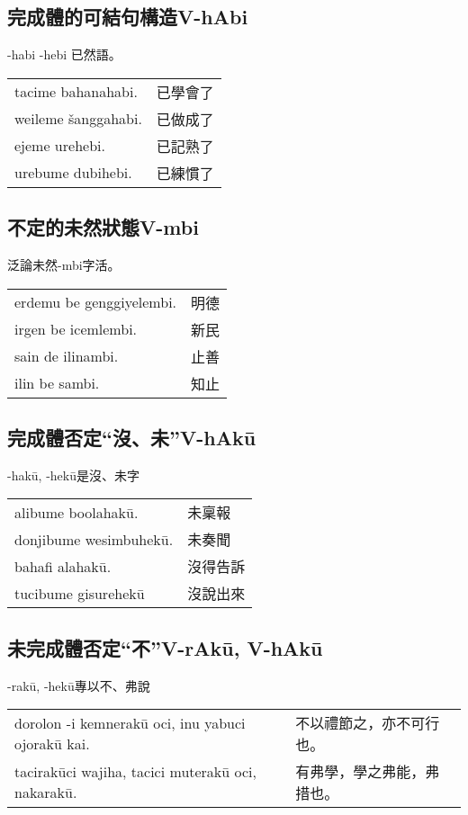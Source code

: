 \documentclass{article}
\begin{document}
\subsection{完成體的可結句構造V-hAbi}
\noindent -habi -hebi 已然語。
\begin{center}
    \begin{tabularx}{\textwidth}{XX}
        tacime bahanahabi. & 已學會了\\
        weileme \v{s}anggahabi. & 已做成了\\
        ejeme urehebi. & 已記熟了\\
        urebume dubihebi. & 已練慣了\\
    \end{tabularx}
\end{center}

\subsection{不定的未然狀態V-mbi}
\noindent 泛論未然-mbi字活。
\begin{center}
    \begin{tabularx}{\textwidth}{XX}
        erdemu be genggiyelembi. & 明德\\
        irgen be icemlembi. & 新民\\
        sain de ilinambi. & 止善\\
        ilin be sambi. & 知止\\
    \end{tabularx}
\end{center}

\subsection{完成體否定“沒、未”V-hAk\={u}}
\noindent -hak\={u}, -hek\={u}是沒、未字
\begin{center}
    \begin{tabularx}{\textwidth}{XX}
        alibume boolahak\={u}. & 未稟報\\
        donjibume wesimbuhek\={u}. & 未奏聞\\
        bahafi alahak\={u}. & 沒得告訴\\
        tucibume gisurehek\={u} & 沒說出來
    \end{tabularx}
\end{center}

\subsection{未完成體否定“不”V-rAk\={u}, V-hAk\={u}}
\noindent -rak\={u}, -hek\={u}專以不、弗說
\begin{center}
    \begin{tabularx}{\textwidth}{XX}
        dorolon -i kemnerak\={u} oci, inu yabuci ojorak\={u} kai. & 不以禮節之，亦不可行也。\\
        tacirak\={u}ci wajiha, tacici muterak\={u} oci, nakarak\={u}. & 有弗學，學之弗能，弗措也。
    \end{tabularx}
\end{center}
\end{document}
